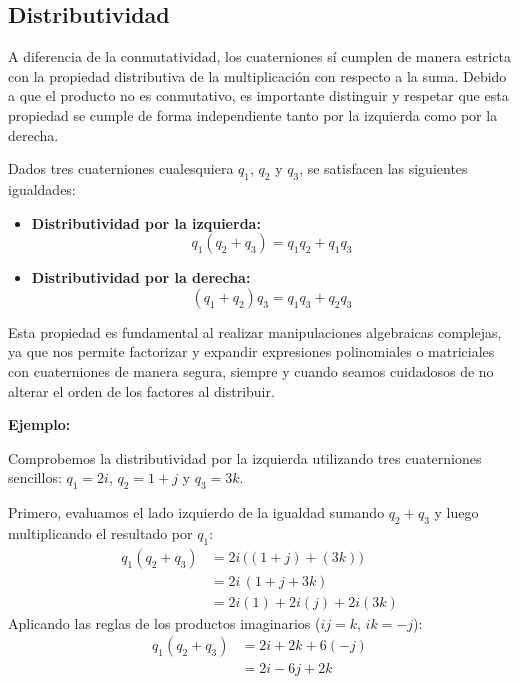 \subsection{Distributividad}
A diferencia de la conmutatividad, los cuaterniones sí cumplen de manera estricta con la propiedad distributiva de la multiplicación con respecto a la suma. Debido a que el producto no es conmutativo, es importante distinguir y respetar que esta propiedad se cumple de forma independiente tanto por la izquierda como por la derecha.

Dados tres cuaterniones cualesquiera $q_1$, $q_2$ y $q_3$, se satisfacen las siguientes igualdades:
\begin{itemize}
    \item \textbf{Distributividad por la izquierda:}
    \begin{equation}
        q_1 (q_2 + q_3) = q_1 q_2 + q_1 q_3
    \end{equation}
    \item \textbf{Distributividad por la derecha:}
    \begin{equation}
        (q_1 + q_2) q_3 = q_1 q_3 + q_2 q_3
    \end{equation}
\end{itemize}

Esta propiedad es fundamental al realizar manipulaciones algebraicas complejas, ya que nos permite factorizar y expandir expresiones polinomiales o matriciales con cuaterniones de manera segura, siempre y cuando seamos cuidadosos de no alterar el orden de los factores al distribuir.

\textbf{Ejemplo:}

Comprobemos la distributividad por la izquierda utilizando tres cuaterniones sencillos: $q_1 = 2i$, $q_2 = 1 + j$ y $q_3 = 3k$.

Primero, evaluamos el lado izquierdo de la igualdad sumando $q_2 + q_3$ y luego multiplicando el resultado por $q_1$:
\begin{align*}
    q_1 (q_2 + q_3) &= 2i \, \big( (1 + j) + (3k) \big) \\
    &= 2i \, (1 + j + 3k) \\
    &= 2i(1) + 2i(j) + 2i(3k) 
\end{align*}
Aplicando las reglas de los productos imaginarios ($ij = k$, $ik = -j$):
\begin{align*}
    q_1 (q_2 + q_3) &= 2i + 2k + 6(-j) \\
    &= 2i - 6j + 2k
\end{align*}

